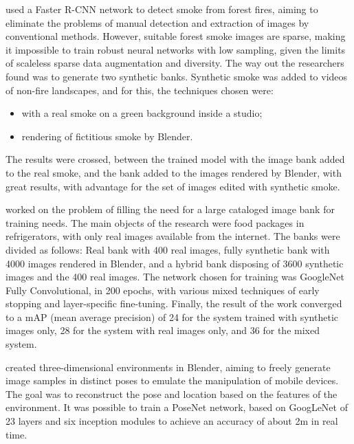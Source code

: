     \cite{BlenderSmoke} used a Faster R-CNN network to detect smoke from forest fires, aiming to eliminate the problems of manual detection and extraction of images by conventional methods. 
    However, suitable forest smoke images are sparse, making it impossible to train robust neural networks with low sampling, given the limits of scaleless sparse data augmentation and diversity.
    The way out the researchers found was to generate two synthetic banks. 
    Synthetic smoke was added to videos of non-fire landscapes, and for this, the techniques chosen were:
    \begin{itemize}
	    \item with a real smoke on a green background inside a studio;
    	\item rendering of fictitious smoke by Blender.
    \end{itemize}
    The results were crossed, between the trained model with the image bank added to the real smoke, and the bank added to the images rendered by Blender, with great results, with advantage for the set of images edited with synthetic smoke.
    
    \cite{ObjetoSintetico} worked on the problem of filling the need for a large cataloged image bank for training needs. The main objects of the research were food packages in refrigerators, with only real images available from the internet. The banks were divided as follows: Real bank with 400 real images, fully synthetic bank with 4000 images rendered in Blender, and a hybrid bank disposing of 3600 synthetic images and the 400 real images.
    The network chosen for training was GoogleNet Fully Convolutional, in 200 epochs, with various mixed techniques of early stopping and layer-specific fine-tuning.
    Finally, the result of the work converged to a mAP (mean average precision) of 24 for the system trained with synthetic images only, 28 for the system with real images only, and 36 for the mixed system.

    \cite{BlenderMapa} created three-dimensional environments in Blender, aiming to freely generate image samples in distinct poses to emulate the manipulation of mobile devices.
    The goal was to reconstruct the pose and location based on the features of the environment.
    It was possible to train a PoseNet network, based on GoogLeNet of 23 layers and six inception modules to achieve an accuracy of about 2m in real time.
    
    
    
